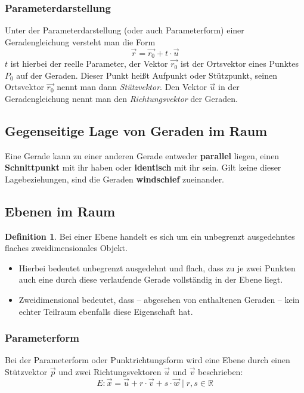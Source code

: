 \documentclass[a4paper,10pt,DIV9, BCOR12mm, oneside,openright,openbib]{scrreprt}
\theoremstyle{definition}
\newtheorem{mydef}{Definition}[section]
\theoremstyle{plain}
\begin{document}
\subsubsection{Parameterdarstellung}  
Unter der Parameterdarstellung (oder auch Parameterform) einer Geradengleichung versteht man die Form
    \[\vec r = \overrightarrow{r_0} + t \cdot \vec u \]
$t$ ist hierbei der reelle Parameter, der Vektor $\overrightarrow{r_0}$ ist der Ortsvektor eines Punktes $P_0$ auf der Geraden. Dieser Punkt heißt Aufpunkt oder Stützpunkt, seinen Ortsvektor $\overrightarrow{r_0}$ nennt man dann \textit{Stützvektor}. Den Vektor $\overrightarrow{u}$ in der Geradengleichung nennt man den \textit{Richtungsvektor} der Geraden.


\subsection{Gegenseitige Lage von Geraden im Raum}
Eine Gerade kann zu einer anderen Gerade entweder \textbf{parallel} liegen, einen \textbf{Schnittpunkt} mit ihr haben oder \textbf{identisch} mit ihr sein.
Gilt keine dieser Lagebeziehungen, sind die Geraden \textbf{windschief} zueinander.

\subsection{Ebenen im Raum}
\begin{mydef}
Bei einer Ebene handelt es sich um ein unbegrenzt ausgedehntes flaches zweidimensionales Objekt.
  \begin{itemize}
    \item Hierbei bedeutet unbegrenzt ausgedehnt und flach, dass zu je zwei Punkten auch eine durch diese verlaufende Gerade vollständig in der Ebene liegt.
    \item Zweidimensional bedeutet, dass – abgesehen von enthaltenen Geraden – kein echter Teilraum ebenfalls diese Eigenschaft hat.
  \end{itemize}
\end{mydef}

\subsubsection{Parameterform}
Bei der Parameterform oder Punktrichtungsform wird eine Ebene durch einen Stützvektor $\overrightarrow{p}$ und zwei Richtungsvektoren $\overrightarrow{u}$ und $\overrightarrow{v}$ beschrieben:
    \[E: \overrightarrow{x} = \overrightarrow{u} + r \cdot \overrightarrow{v} + s \cdot \overrightarrow{w} \mid r,s \in \mathbb{R}\]
\end{document}
